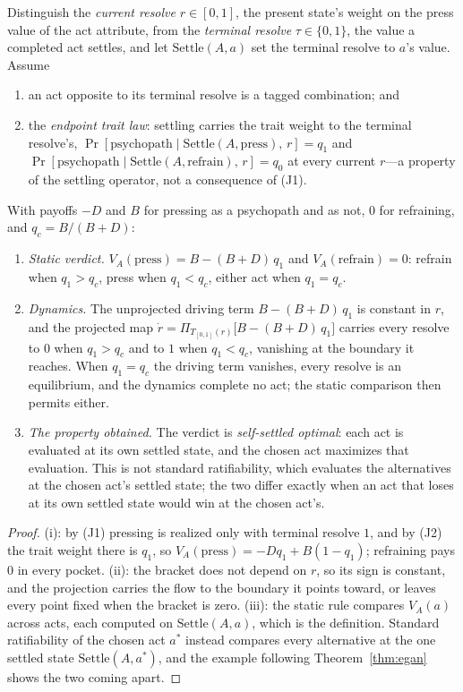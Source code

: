 \begin{proposition}\label{prop:egan-self}
Distinguish the \emph{current resolve} $r \in [0,1]$, the present state's weight on the press value of the act attribute, from the \emph{terminal resolve} $\tau \in \{0, 1\}$, the value a completed act settles, and let $\mathrm{Settle}(A, a)$ set the terminal resolve to $a$'s value. Assume
\begin{enumerate}[label=(J\arabic*), leftmargin=2.4em, itemsep=0.1em]
\item an act opposite to its terminal resolve is a tagged combination; and
\item the \emph{endpoint trait law}: settling carries the trait weight to the terminal resolve's, $\Pr[\text{psychopath} \mid \mathrm{Settle}(A, \text{press}),\, r] = q_1$ and $\Pr[\text{psychopath} \mid \mathrm{Settle}(A, \text{refrain}),\, r] = q_0$ at every current $r$---a property of the settling operator, not a consequence of (J1).
\end{enumerate}
With payoffs $-D$ and $B$ for pressing as a psychopath and as not, $0$ for refraining, and $q_c = B/(B+D)$:
\begin{enumerate}[label=(\roman*), leftmargin=2.4em, itemsep=0.1em]
\item \emph{Static verdict.} $V_A(\text{press}) = B - (B+D)\,q_1$ and $V_A(\text{refrain}) = 0$: refrain when $q_1 > q_c$, press when $q_1 < q_c$, either act when $q_1 = q_c$.
\item \emph{Dynamics.} The unprojected driving term $B - (B+D)\,q_1$ is constant in $r$, and the projected map $\dot r = \Pi_{T_{[0,1]}(r)}\big[B - (B+D)\,q_1\big]$ carries every resolve to $0$ when $q_1 > q_c$ and to $1$ when $q_1 < q_c$, vanishing at the boundary it reaches. When $q_1 = q_c$ the driving term vanishes, every resolve is an equilibrium, and the dynamics complete no act; the static comparison then permits either.
\item \emph{The property obtained.} The verdict is \emph{self-settled optimal}: each act is evaluated at its own settled state, and the chosen act maximizes that evaluation. This is not standard ratifiability, which evaluates the alternatives at the chosen act's settled state; the two differ exactly when an act that loses at its own settled state would win at the chosen act's.
\end{enumerate}
\end{proposition}
\begin{proof}
(i): by (J1) pressing is realized only with terminal resolve $1$, and by (J2) the trait weight there is $q_1$, so $V_A(\text{press}) = -D q_1 + B(1 - q_1)$; refraining pays $0$ in every pocket. (ii): the bracket does not depend on $r$, so its sign is constant, and the projection carries the flow to the boundary it points toward, or leaves every point fixed when the bracket is zero. (iii): the static rule compares $V_A(a)$ across acts, each computed on $\mathrm{Settle}(A, a)$, which is the definition. Standard ratifiability of the chosen act $a^{\ast}$ instead compares every alternative at the one settled state $\mathrm{Settle}(A, a^{\ast})$, and the example following Theorem~\ref{thm:egan} shows the two coming apart.
\end{proof}

